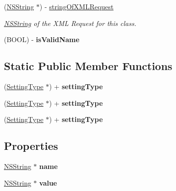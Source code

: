 \begin{DoxyCompactItemize}
(\hyperlink{class_n_s_string}{NSString} $\ast$) -\/ \hyperlink{interface_setting_type_a73be2186b19c1f2b6002da3893ec9ba5}{stringOfXMLRequest}
\begin{DoxyCompactList}\small\item\em \hyperlink{class_n_s_string}{NSString} of the XML Request for this class. \item\end{DoxyCompactList}\item 
\hypertarget{interface_setting_type_a700230188b6c19c6a33f481ef8f1c41f}{
(BOOL) -\/ {\bfseries isValidName}}
\label{interface_setting_type_a700230188b6c19c6a33f481ef8f1c41f}

\end{DoxyCompactItemize}
\subsection*{Static Public Member Functions}
\begin{DoxyCompactItemize}
\item 
\hypertarget{interface_setting_type_aab675582b4298e70d5f59bf7fd99cc07}{
(\hyperlink{interface_setting_type}{SettingType} $\ast$) + {\bfseries settingType}}
\label{interface_setting_type_aab675582b4298e70d5f59bf7fd99cc07}

\item 
\hypertarget{interface_setting_type_aab675582b4298e70d5f59bf7fd99cc07}{
(\hyperlink{interface_setting_type}{SettingType} $\ast$) + {\bfseries settingType}}
\label{interface_setting_type_aab675582b4298e70d5f59bf7fd99cc07}

\item 
\hypertarget{interface_setting_type_aab675582b4298e70d5f59bf7fd99cc07}{
(\hyperlink{interface_setting_type}{SettingType} $\ast$) + {\bfseries settingType}}
\label{interface_setting_type_aab675582b4298e70d5f59bf7fd99cc07}

\end{DoxyCompactItemize}
\subsection*{Properties}
\begin{DoxyCompactItemize}
\item 
\hypertarget{interface_setting_type_a09cf2a0987ba61e50aafa8246f034bcf}{
\hyperlink{class_n_s_string}{NSString} $\ast$ {\bfseries name}}
\label{interface_setting_type_a09cf2a0987ba61e50aafa8246f034bcf}

\item 
\hypertarget{interface_setting_type_a3a0bde0ce9c462f13515e5b540f39fd9}{
\hyperlink{class_n_s_string}{NSString} $\ast$ {\bfseries value}}
\label{interface_setting_type_a3a0bde0ce9c462f13515e5b540f39fd9}

\end{DoxyCompactItemize}


